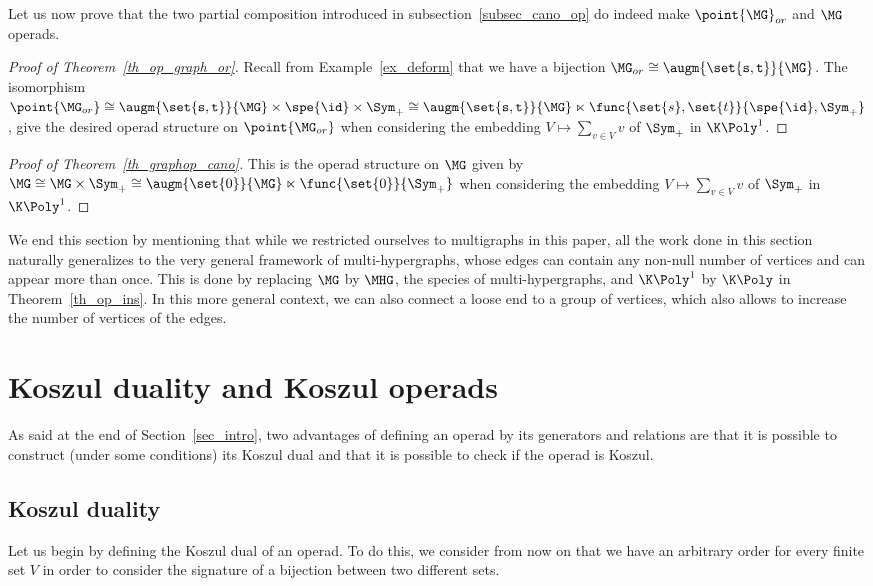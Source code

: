 Let us now prove that the two partial composition introduced in subsection~\ref{subsec_cano_op} do indeed 
make $\point{\MG}_{or}$ and $\MG$ operads.

\begin{proof}[Proof of Theorem~\ref{th_op_graph_or}]
    Recall from Example~\ref{ex_deform} that we have a bijection 
    $\MG_{or}\cong \augm{\set{\mathtt{s,t}}}{\MG}$. The isomorphism 
    $\point{\MG_{or}}\cong \augm{\set{\mathtt{s,t}}}{\MG}\times\spe{\id}\times\Sym_+ \cong \augm{\set{\mathtt{s,t}}}{\MG}\ltimes\func{\set{s},\set{t}}{\spe{\id},\Sym_+}$, 
    give the desired operad structure on $\point{\MG_{or}}$ when considering the embedding 
    $V\mapsto \sum_{v\in V}v$ of $\Sym_+$ in $\K\Poly^1$.
\end{proof}

\begin{proof}[Proof of Theorem~\ref{th_graphop_cano}]
    This is the operad structure on $\MG$ given by 
    $\MG\cong \MG\times\Sym_+\cong \augm{\set{0}}{\MG}\ltimes\func{\set{0}}{\Sym_+}$
    when considering the embedding $V\mapsto \sum_{v\in V}v$ of $\Sym_+$ in $\K\Poly^1$.
\end{proof}

We end this section by mentioning that while we restricted ourselves to multigraphs in this paper, all the 
work done in this section naturally generalizes to the very general framework of multi-hypergraphs, whose 
edges can contain any non-null number of vertices and can appear more than once. This is done by replacing 
$\MG$ by $\MHG$, the species of multi-hypergraphs, and $\K\Poly^1$ by $\K\Poly$ in Theorem~\ref{th_op_ins}.
In this more general context, we can also connect a loose end to a group of vertices, which also allows to 
increase the number of vertices of the edges. 

\appendix


\section{Koszul duality and Koszul operads}\label{ann_koszul}
As said at the end of Section~\ref{sec_intro}, 
two advantages of defining an operad by its generators and relations are
that it is possible to construct (under some conditions) its Koszul dual and 
that it is possible to check if the operad is Koszul.


\subsection*{Koszul duality}
Let us begin by defining the Koszul dual of an operad.
To do this, we consider from now on that we have an arbitrary order for every finite set $V$ in order to consider the signature of a bijection 
between two different sets. 

